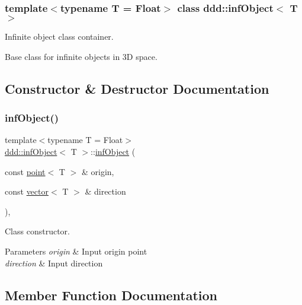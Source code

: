 \subsubsection*{template$<$typename T = Float$>$\newline
class ddd\+::inf\+Object$<$ T $>$}

Infinite object class container. 

Base class for infinite objects in 3D space. 

\subsection{Constructor \& Destructor Documentation}
\mbox{\label{classddd_1_1inf_object_aa06201c7c310e553e71dd4a45aa493fa}} 
\subsubsection{\texorpdfstring{inf\+Object()}{infObject()}}
{\footnotesize\ttfamily template$<$typename T = Float$>$ \\
\hyperlink{classddd_1_1inf_object}{ddd\+::inf\+Object}$<$ T $>$\+::\hyperlink{classddd_1_1inf_object}{inf\+Object} (\begin{DoxyParamCaption}\item[{const \hyperlink{classddd_1_1point}{point}$<$ T $>$ \&}]{origin,  }\item[{const \hyperlink{classddd_1_1vector}{vector}$<$ T $>$ \&}]{direction }\end{DoxyParamCaption})\hspace{0.3cm}{\ttfamily [inline]}, {\ttfamily [protected]}}



Class constructor. 


\begin{DoxyParams}{Parameters}
{\em origin} & Input origin point \\
\hline
{\em direction} & Input direction \\
\hline
\end{DoxyParams}


\subsection{Member Function Documentation}
\mbox{\label{classddd_1_1inf_object_af788c09aac2cec319223d83db66b9a05}} 
